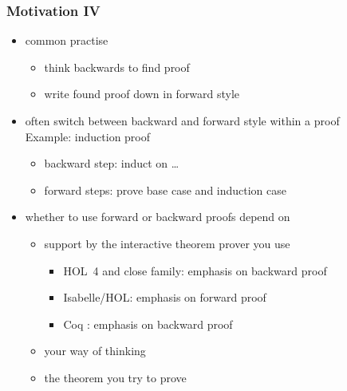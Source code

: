 \begin{frame}
\frametitle{Motivation IV}
\begin{itemize}
\item common practise
\begin{itemize}
\item think backwards to find proof
\item write found proof down in forward style
\end{itemize}
\item often switch between backward and forward style within a proof\\
Example: induction proof
\begin{itemize}
\item backward step: induct on \ldots
\item forward steps: prove base case and induction case
\end{itemize}
\item whether to use forward or backward proofs depend on
\begin{itemize}
\item support by the interactive theorem prover you use
\begin{itemize}
\item HOL~4 and close family: emphasis on backward proof
\item Isabelle/HOL: emphasis on forward proof
\item Coq : emphasis on backward proof
\end{itemize}
\item your way of thinking
\item the theorem you try to prove
\end{itemize}
\end{itemize}
\end{frame}


